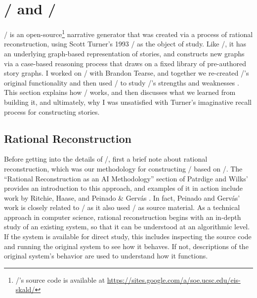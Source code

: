 \chapter{\minstrel/ and \skald/}

\label{ch:skald}

\skald/ is an open-source\footnote{\skald/'s source code is available at \url{https://sites.google.com/a/soe.ucsc.edu/eis-skald/}} narrative generator that was created via a process of rational reconstruction, using Scott Turner's 1993 \minstrel/ as the object of study.
%
Like \minstrel/, it has an underlying graph-based representation of stories, and constructs new graphs via a case-based reasoning process that draws on a fixed library of pre-authored story graphs.
%
I worked on \skald/ with Brandon Tearse, and together we re-created \minstrel/'s original functionality and then used \skald/ to study \minstrel/'s strengths and weaknesses \citep{Tearse2011, Tearse2012, Tearse2014}.
%
This section explains how \skald/ works, and then discusses what we learned from building it, and ultimately, why I was unsatisfied with Turner's imaginative recall process for constructing stories.



\section{Rational Reconstruction}


Before getting into the details of \skald/, first a brief note about rational reconstruction, which was our methodology for constructing \skald/ based on \minstrel/.
%
The ``Rational Reconstruction as an AI Methodology'' section of Patrdige and Wilks'  \citep{Patridge1990} provides an introduction to this approach, and examples of it in action include work by Ritchie, Haase, and Peinado \& Gerv\'as \citep{Ritchie1984,Haase1986,Peinado2006}.
%
In fact, Peinado and Gerv\'as' work is closely related to \skald/ as it also used \minstrel/ as source material.
%
As a technical approach in computer science, rational reconstruction begins with an in-depth study of an existing system, so that it can be understood at an algorithmic level.
%
If the system is available for direct study, this includes inspecting the source code and running the original system to see how it behaves.
%
If not, descriptions of the original system's behavior are used to understand how it functions.


